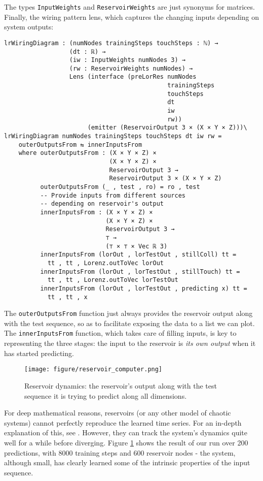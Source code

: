 The types \texttt{InputWeights} and \texttt{ReservoirWeights} are just synonyms for matrices. Finally, the wiring pattern lens, which captures the changing inputs depending on system outputs:

\begin{verbatim}
lrWiringDiagram : (numNodes trainingSteps touchSteps : ℕ) → 
                  (dt : ℝ) → 
                  (iw : InputWeights numNodes 3) → 
                  (rw : ReservoirWeights numNodes) → 
                  Lens (interface (preLorRes numNodes 
                                             trainingSteps 
                                             touchSteps 
                                             dt 
                                             iw 
                                             rw)) 
                       (emitter (ReservoirOutput 3 × (X × Y × Z)))\
lrWiringDiagram numNodes trainingSteps touchSteps dt iw rw = 
    outerOutputsFrom ⇆ innerInputsFrom
    where outerOutputsFrom : (X × Y × Z) × 
                             (X × Y × Z) × 
                             ReservoirOutput 3 → 
                             ReservoirOutput 3 × (X × Y × Z)
          outerOutputsFrom (_ , test , ro) = ro , test
          -- Provide inputs from different sources
          -- depending on reservoir's output
          innerInputsFrom : (X × Y × Z) × 
                            (X × Y × Z) × 
                            ReservoirOutput 3 → 
                            ⊤ → 
                            (⊤ × ⊤ × Vec ℝ 3)
          innerInputsFrom (lorOut , lorTestOut , stillColl) tt = 
            tt , tt , Lorenz.outToVec lorOut
          innerInputsFrom (lorOut , lorTestOut , stillTouch) tt =
            tt , tt , Lorenz.outToVec lorTestOut
          innerInputsFrom (lorOut , lorTestOut , predicting x) tt = 
            tt , tt , x
\end{verbatim}

The \texttt{outerOutputsFrom} function just always provides the reservoir output along with the test sequence, so as to facilitate exposing the data to a list we can plot. The \texttt{innerInputsFrom} function, which takes care of filling inputs, is key to representing the three stages: the input to the reservoir is \textit{its own output} when it has started predicting.

\begin{figure}
    \centering
    \texttt{[image: figure/reservoir\_computer.png]}
    \caption{Reservoir dynamics: the reservoir's output along with the test sequence it is trying to predict along all dimensions.}
    \label{fig:reservoir_dynamics}
\end{figure}

For deep mathematical reasons, reservoirs (or any other model of chaotic systems) cannot perfectly reproduce the learned time series. For an in-depth explanation of this, see \cite{strogatz2001nonlinear}. However, they can track the system's dynamics quite well for a while before diverging. Figure \ref{fig:reservoir_dynamics} shows the result of our run over 200 predictions, with 8000 training steps and 600 reservoir nodes - the system, although small, has clearly learned some of the intrinsic properties of the input sequence.